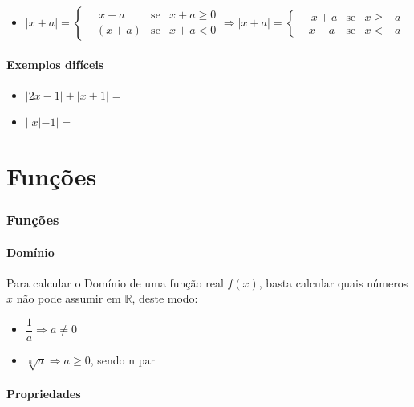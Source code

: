 \documentclass[12pt]{article}
\begin{document}
\begin{itemize}
\item $ |x+a| =
\left\{\begin{array}{lcl}
\quad x+a & \text{se} & x+a \geq 0\\
-(x+a) & \text{se} & x+a < 0
\end{array}\right.
\Rightarrow
|x+a| = 
\left\{\begin{array}{lcl}
\quad x+a & \text{se} & x \geq -a\\
-x-a & \text{se} & x < -a
\end{array}\right.$
\end{itemize}

\subsection{Exemplos difíceis}

\begin{itemize}
\item $|2x-1| + |x+1| = $
\\[2cm]
\item $||x| - 1| = $
\end{itemize}

\newpage

\part{Funções}

\section{Funções}

\subsection{Domínio}

Para calcular o Domínio de uma função real $f(x)$, basta calcular quais números $x$ não pode assumir em $\mathbb{R}$, deste modo:

\begin{itemize}
\item $\dfrac{1}{a} \Rightarrow a \neq 0$
\item $\sqrt[n]{a} \Rightarrow a \geq 0$, sendo n par
\end{itemize}

\subsection{Propriedades}
\end{document}

